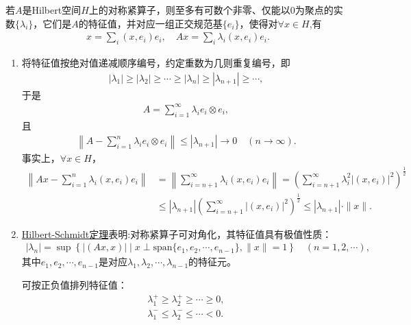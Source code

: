 \documentclass[../../main.tex]{subfiles}%
\begin{document}
\begin{theorem}\label{theorem:Hilbert-Schmidt定理}
若$A$是Hilbert空间$H$上的对称紧算子，则至多有可数个非零、仅能以$0$为聚点的实数$\{\lambda_i\}$，它们是$A$的特征值，并对应一组正交规范基$\{e_i\}$，使得对$\forall x\in H$,有
\begin{align}
x=\sum\limits_{i}(x,e_i)e_i,\quad 
Ax=\sum\limits_{i}\lambda_i(x,e_i)e_i.\label{eq:hs-exp-ax}
\end{align}
\end{theorem}
\begin{remark}
\begin{enumerate}[(1)]
\item 将特征值按绝对值递减顺序编号，约定重数为几则重复编号，即
\begin{align*}
|\lambda_1|\geqslant|\lambda_2|\geqslant\cdots\geqslant|\lambda_n|\geqslant|\lambda_{n+1}|\geqslant\cdots,
\end{align*}
于是
\begin{align*}
A=\sum\limits_{i=1}^{\infty}\lambda_i e_i\otimes e_i,
\end{align*}
且
\begin{align*}
\left\|A-\sum\limits_{i=1}^{n}\lambda_i e_i\otimes e_i\right\|\leqslant|\lambda_{n+1}|\to0\quad(n\to\infty).
\end{align*}
事实上，$\forall x\in H$，
\begin{align*}
\left\|Ax-\sum\limits_{i=1}^{n}\lambda_i(x,e_i)e_i\right\|&=\left\|\sum\limits_{i=n+1}^{\infty}\lambda_i(x,e_i)e_i\right\|
=\left(\sum\limits_{i=n+1}^{\infty}\lambda_i^2|(x,e_i)|^2\right)^{\frac{1}{2}}\\
&\leqslant|\lambda_{n+1}|\left(\sum\limits_{i=n+1}^{\infty}|(x,e_i)|^2\right)^{\frac{1}{2}}\leqslant|\lambda_{n+1}|\cdot\|x\|.
\end{align*}
\item \hyperref[theorem:Hilbert-Schmidt定理]{Hilbert-Schmidt定理}表明:对称紧算子可对角化，其特征值具有极值性质：
\begin{align*}
|\lambda_n|=\sup\left\{|(Ax,x)|\mid x\perp\mathrm{span}\{e_1,e_2,\cdots,e_{n-1}\},\|x\|=1\right\}\quad(n=1,2,\cdots),
\end{align*}
其中$e_1,e_2,\cdots,e_{n-1}$是对应$\lambda_1,\lambda_2,\cdots,\lambda_{n-1}$的特征元。

可按正负值排列特征值：
\begin{align*}
\lambda_1^+\geqslant\lambda_2^+\geqslant\cdots\geqslant0,\\
\lambda_1^-\leqslant\lambda_2^-\leqslant\cdots<0.
\end{align*}
\end{enumerate}
\end{remark}
\end{document}
